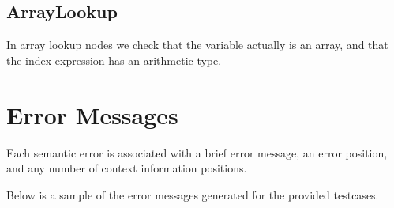 \documentclass[a4paper,11pt]{article}
\begin{document}
\subsection{ArrayLookup}
In array lookup nodes we check that the variable actually is an array, and that
the index expression has an arithmetic type.

\section{Error Messages}
Each semantic error is associated with a brief error message, an error position,
and any number of context information positions.

Below is a sample of the error messages generated for the provided testcases.

\end{document}
